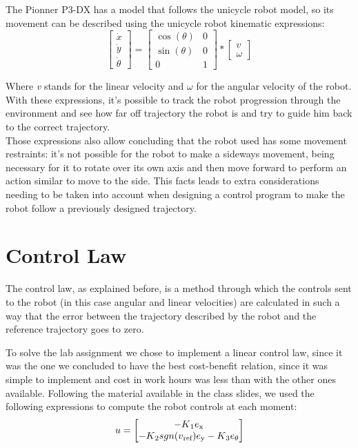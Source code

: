 \documentclass[11pt,a4paper]{scrartcl}
\def\SB#1{\textsubscript{#1}}
\begin{document}
The Pionner P3-DX has a model that follows the unicycle robot model, so its movement can be described using the unicycle robot kinematic expressions:
	\[\begin{bmatrix}\dot{x}\\ \dot{y}\\ \dot{\theta} \end{bmatrix} = 
    	\begin{bmatrix} \cos(\theta) & 0\\ \sin(\theta) & 0\\ 0 & 1 \end{bmatrix} * 
        \begin{bmatrix} v \\ \omega \end{bmatrix}\]

Where \textit{v} stands for the linear velocity and $\omega$ for the angular velocity of the robot. With these expressions, it's possible to track the robot progression through the environment and see how far off trajectory the robot is and try to guide him back to the correct trajectory.\\
Those expressions also allow concluding that the robot used has some movement restraints: it's not possible for the robot to make a sideways movement, being necessary for it to rotate over its own axis and then move forward to perform an action similar to move to the side. This facts leads to extra considerations needing to be taken into account when designing a control program to make the robot follow a previously designed trajectory.

\section{Control Law}
The control law, as explained before, is a method through which the controls sent to the robot (in this case angular and linear velocities) are calculated in such a way that the error between the trajectory described by the robot and the reference trajectory goes to zero.

To solve the lab assignment we chose to implement a linear control law, since it was the one we concluded to have the best cost-benefit relation, since it was simple to implement and cost in work hours was less than with the other ones available. Following the material available in the class slides, we used the following expressions to compute the robot controls at each moment:
	\[u = \begin{bmatrix} -K\SB{1}e\SB{x} \\ -K\SB{2}sgn(v\SB{ref})e\SB{y} - K\SB{3}e\SB{$\theta$}\end{bmatrix}\]
    
\end{document}
